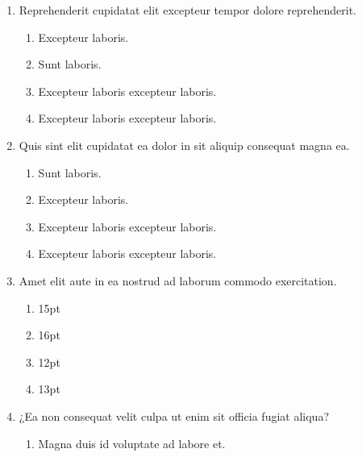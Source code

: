 \documentclass[a4paper,12pt]{article}
\begin{document}
\begin{enumerate}[label=\textbf{\arabic*.}]
\begin{multicols}{2}
\end{multicols}
\item Reprehenderit cupidatat elit excepteur tempor dolore reprehenderit.
\begin{multicols}{2}
	\begin{enumerate}
		\item  Excepteur laboris.
    
		\item  Sunt laboris.
    
		\item  Excepteur laboris excepteur laboris.
  
		\item  Excepteur laboris excepteur laboris.
    
	\end{enumerate}

\end{multicols}
\item Quis sint elit cupidatat ea dolor in sit aliquip consequat magna ea.
\begin{multicols}{2}
	\begin{enumerate}
		\item  Sunt laboris.
    
		\item  Excepteur laboris.
    
		\item  Excepteur laboris excepteur laboris.
    
		\item  Excepteur laboris excepteur laboris.
  
	\end{enumerate}

\end{multicols}
\item Amet elit aute in ea nostrud ad laborum commodo exercitation.
\begin{multicols}{4}
	\begin{enumerate}
		\item  15pt
    
		\item  16pt
  
		\item  12pt
    
		\item  13pt
    
	\end{enumerate}

\end{multicols}
\item ¿Ea non consequat velit culpa ut enim sit officia fugiat aliqua?
\begin{multicols}{2}
	\begin{enumerate}
		\item  Magna duis id voluptate ad labore et.
  

\end{enumerate}
\end{multicols}
\end{enumerate}
\end{document}
